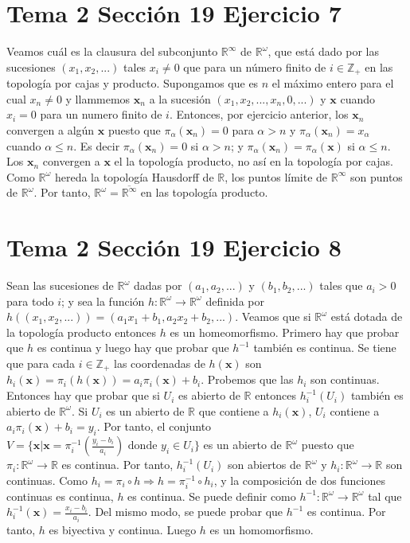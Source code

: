 \documentclass{article}
\newcommand{\vect}[1]{\boldsymbol{#1}}
\begin{document}
\section{Tema 2 Sección 19 Ejercicio 7}
Veamos cuál es la clausura del subconjunto $\mathbb{R}^\infty$ de $\mathbb{R}^\omega$, que está dado por las sucesiones $(x_1,x_2,...)$ tales $x_i\neq 0$ que para un número finito de $i\in \mathbb{Z}_+$ en las topología por cajas y producto. Supongamos que es $n$ el máximo  entero para el cual $x_n\neq 0$ y llammemos $\vect{x}_n$ a la sucesión $(x_1,x_2,...,x_n,0,...)$ y $\vect{x}$ cuando $x_i= 0$ para un numero finito de $i$. Entonces, por ejercicio anterior, los $\vect{x}_n$ convergen a algún $\vect{x}$ puesto que $\pi_\alpha(\vect{x}_n)=0$ para $\alpha>n$ y $\pi_\alpha(\vect{x}_n)= x_{\alpha}$ cuando $\alpha\leq n$. Es decir $\pi_\alpha(\vect{x}_n)=0$ si $\alpha > n$; y $\pi_\alpha(\vect{x}_n)=\pi_\alpha(\vect{x})$ si $\alpha\leq n$. Los $\vect{x}_n$ convergen a $\vect{x}$ el la topología producto, no así en la topología por cajas. Como $\mathbb{R}^\omega$ hereda la topología Hausdorff de $\mathbb{R}$, los puntos límite de $\mathbb{R}^\infty$ son puntos de  $\mathbb{R}^\omega$. Por tanto, $\mathbb{R}^\omega = \overline{\mathbb{R}^\infty}$ en las topología producto.
\section{Tema 2 Sección 19 Ejercicio 8}
Sean las sucesiones de $\mathbb{R}^\omega$ dadas por $(a_1,a_2,...)$ y $(b_1,b_2,...)$ tales que $a_i>0$ para todo $i$; y sea la función $h:\mathbb{R}^\omega\rightarrow \mathbb{R}^\omega$ definida por $h((x_1,x_2,...))=(a_1x_1+b_1,a_2x_2+b_2,...)$. Veamos que si $\mathbb{R}^\omega$ está dotada de la topología producto entonces $h$ es un homeomorfismo. Primero hay que probar que $h$ es continua y luego hay que probar que $h^{-1}$ también es continua.  Se tiene que para cada $i\in \mathbb{Z}_+$ las coordenadas de $h(\vect{x})$ son $h_i(\vect{x})=\pi_i(h(\vect{x}))=a_i\pi_i(\vect{x})+b_i$. Probemos que las $h_i$ son continuas. Entonces hay que probar que si $U_i$ es abierto de $\mathbb{R}$ entonces $h^{-1}_i(U_i)$ también es abierto de $\mathbb{R}^{\omega}$. Si $U_i$ es un abierto de $\mathbb{R}$ que contiene a $h_i(\vect{x})$, $U_i$ contiene a $a_i\pi_i(\vect{x})+b_i=y_i$. Por tanto, el conjunto $V= \{\vect{x}|\vect{x}=\pi_i^{-1}(\frac{y_i-b_i}{a_i}) \text{ donde }y_i\in U_i\}$ es un abierto de $\mathbb{R}^{\omega}$ puesto que $\pi_i:\mathbb{R}^{\omega}\rightarrow \mathbb{R}$ es continua. Por tanto, $h^{-1}_i(U_i)$ son abiertos de $\mathbb{R}^{\omega}$ y $h_i: \mathbb{R}^{\omega}\rightarrow \mathbb{R}$ son continuas. Como $h_i=\pi_i \circ h\Rightarrow h=\pi_i^{-1} \circ h_i$, y la composición de dos funciones continuas es continua, $h$ es continua. Se puede definir como $h^{-1}:\mathbb{R}^\omega\rightarrow \mathbb{R}^\omega$ tal que $h^{-1}_i(\vect{x})=\frac{x_i-b_i}{a_i}$. Del mismo modo, se puede probar que $h^{-1}$ es continua. Por tanto, $h$ es biyectiva y continua. Luego $h$ es un  homomorfismo.
\end{document}
